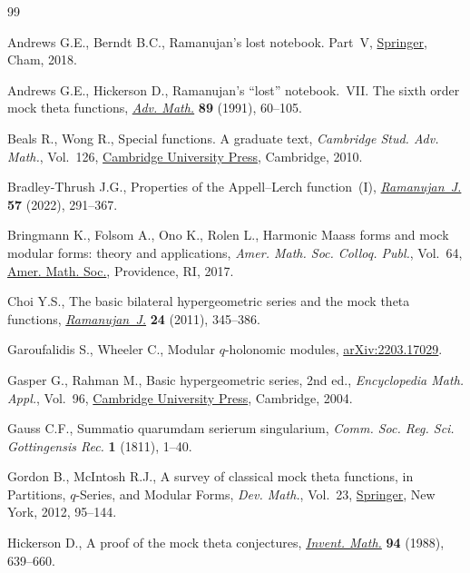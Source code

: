 \documentclass[pdftex]{sigma}
\numberwithin{equation}{section}
\theoremstyle{definition}
\begin{document}
\begin{thebibliography}{99}
\footnotesize\itemsep=0pt

Andrews G.E., Berndt B.C., Ramanujan's lost notebook. {P}art~{V}, \href{https://doi.org/10.1007/978-3-319-77834-1}{Springer},
 Cham, 2018.

Andrews G.E., Hickerson D., Ramanujan's ``lost'' notebook.~{VII}. {T}he sixth
 order mock theta functions, \href{https://doi.org/10.1016/0001-8708(91)90083-J}{\textit{Adv. Math.}} \textbf{89} (1991), 60--105.

Beals R., Wong R., Special functions. A graduate text, \textit{Cambridge Stud.
 Adv. Math.}, Vol.~126, \href{https://doi.org/10.1017/CBO9780511762543}{Cambridge University Press}, Cambridge, 2010.

Bradley-Thrush J.G., Properties of the {A}ppell--{L}erch function~({I}),
 \href{https://doi.org/10.1007/s11139-021-00445-4}{\textit{Ramanujan~J.}} \textbf{57} (2022), 291--367.

Bringmann K., Folsom A., Ono K., Rolen L., Harmonic {M}aass forms and mock
 modular forms: theory and applications, \textit{Amer. Math. Soc. Colloq.
 Publ.}, Vol.~64, \href{https://doi.org/10.1090/coll/064}{Amer. Math. Soc.}, Providence, RI, 2017.

Choi Y.S., The basic bilateral hypergeometric series and the mock theta
 functions, \href{https://doi.org/10.1007/s11139-010-9269-7}{\textit{Ramanujan~J.}} \textbf{24} (2011), 345--386.

Garoufalidis S., Wheeler C., Modular $q$-holonomic modules,
 \href{https://arxiv.org/abs/2203.17029}{arXiv:2203.17029}.

Gasper G., Rahman M., Basic hypergeometric series, 2nd ed., \textit{Encyclopedia Math.
 Appl.}, Vol.~96, \href{https://doi.org/10.1017/CBO9780511526251}{Cambridge University Press}, Cambridge, 2004.

Gauss C.F., Summatio quarumdam serierum singularium, \textit{Comm. Soc. Reg.
 Sci. Gottingensis Rec.} \textbf{1} (1811), 1--40.

Gordon B., McIntosh R.J., A survey of classical mock theta functions, in
 Partitions, {$q$}-Series, and Modular Forms, \textit{Dev. Math.}, Vol.~23,
 \href{https://doi.org/10.1007/978-1-4614-0028-8_9}{Springer}, New York, 2012, 95--144.

Hickerson D., A proof of the mock theta conjectures, \href{https://doi.org/10.1007/BF01394279}{\textit{Invent. Math.}}
 \textbf{94} (1988), 639--660.


\end{thebibliography}
\end{document}
